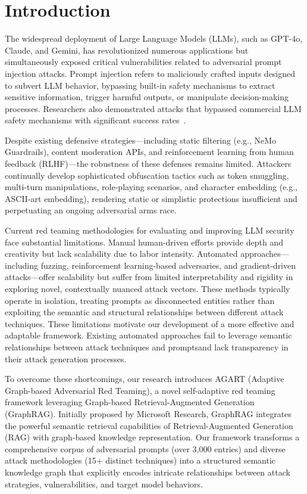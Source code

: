 \section{Introduction}

The widespread deployment of Large Language Models (LLMs), such as GPT-4o, Claude, and Gemini, has revolutionized numerous applications but simultaneously exposed critical vulnerabilities related to adversarial prompt injection attacks. Prompt injection refers to maliciously crafted inputs designed to subvert LLM behavior, bypassing built-in safety mechanisms to extract sensitive information, trigger harmful outputs, or manipulate decision-making processes. Researchers also demonstrated attacks that bypassed commercial LLM safety mechanisms with significant success rates~\cite{liu2024autodan}.

Despite existing defensive strategies—including static filtering (e.g., NeMo Guardrails\cite{nvidia2023nemo}), content moderation APIs, and reinforcement learning from human feedback (RLHF)—the robustness of these defenses remains limited. Attackers continually develop sophisticated obfuscation tactics such as token smuggling, multi-turn manipulations, role-playing scenarios, and character embedding (e.g., ASCII-art embedding), rendering static or simplistic protections insufficient and perpetuating an ongoing adversarial arms race.

Current red teaming methodologies for evaluating and improving LLM security face substantial limitations. Manual human-driven efforts provide depth and creativity but lack scalability due to labor intensity. Automated approaches—including fuzzing\cite{yu2024llmfuzzer}, reinforcement learning-based adversaries, and gradient-driven attacks—offer scalability but suffer from limited interpretability and rigidity in exploring novel, contextually nuanced attack vectors. These methods typically operate in isolation, treating prompts as disconnected entities rather than exploiting the semantic and structural relationships between different attack techniques. These limitations motivate our development of a more effective and adaptable framework. Existing automated approaches fail to leverage semantic relationships between attack techniques and promptsand lack transparency in their attack generation processes.

To overcome these shortcomings, our research introduces AGART (Adaptive Graph-based Adversarial Red Teaming), a novel self-adaptive red teaming framework leveraging Graph-based Retrieval-Augmented Generation (GraphRAG). Initially proposed by Microsoft Research, GraphRAG integrates the powerful semantic retrieval capabilities of Retrieval-Augmented Generation (RAG) with graph-based knowledge representation. Our framework transforms a comprehensive corpus of adversarial prompts (over 3,000 entries) and diverse attack methodologies (15+ distinct techniques) into a structured semantic knowledge graph that explicitly encodes intricate relationships between attack strategies, vulnerabilities, and target model behaviors.

